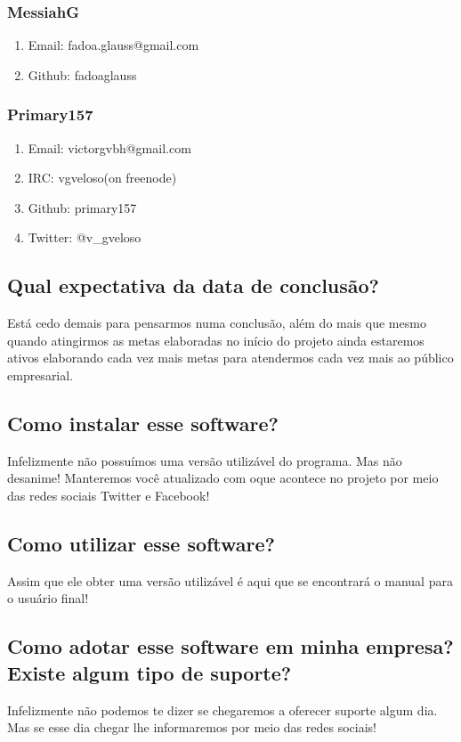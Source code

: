 \documentclass[a4paper,12pt]{article}
\begin{document}
			\subsubsection{MessiahG}
			\begin{enumerate}
				\item Email: fadoa.glauss@gmail.com
				\item Github: fadoaglauss
			\end{enumerate}
			\subsubsection{Primary157}
			\begin{enumerate}
				\item Email: victorgvbh@gmail.com
				\item IRC: vgveloso(on freenode)
				\item Github: primary157
				\item Twitter: @v\_gveloso
			\end{enumerate}
		\subsection{Qual expectativa da data de conclusão?}
			Está cedo demais para pensarmos numa conclusão, além do mais que mesmo quando atingirmos as metas elaboradas no início do projeto ainda estaremos ativos elaborando cada vez mais metas para atendermos cada vez mais ao público empresarial.
		\subsection{Como instalar esse software?}
			Infelizmente não possuímos uma versão utilizável do programa. Mas não desanime! Manteremos você atualizado com oque acontece no projeto por meio das redes sociais Twitter e Facebook!
		\subsection{Como utilizar esse software?}
			Assim que ele obter uma versão utilizável é aqui que se encontrará o manual para o usuário final!
		\subsection{Como adotar esse software em minha empresa? Existe algum tipo de suporte?}
			Infelizmente não podemos te dizer se chegaremos a oferecer suporte algum dia. Mas se esse dia chegar lhe informaremos por meio das redes sociais!
\end{document}
